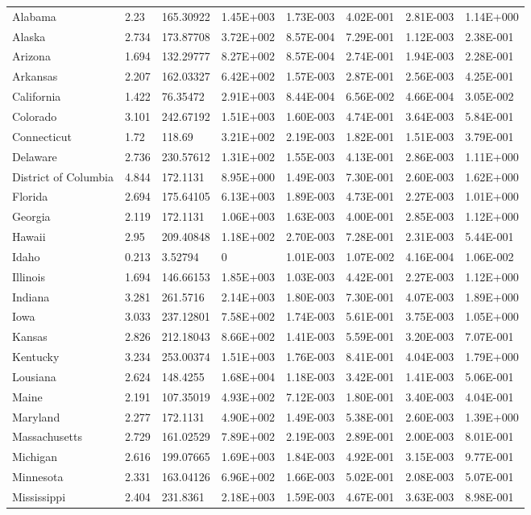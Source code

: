 \begin{longtable}[c]{p{0.75in}p{0.75in}p{0.75in}p{0.75in}p{0.75in}p{0.75in}p{0.75in}p{0.75in}}
Alabama & 2.23 & 165.30922 & 1.45E+003 & 1.73E-003 & 4.02E-001 & 2.81E-003 & 1.14E+000 \tabularnewline
Alaska & 2.734 & 173.87708 & 3.72E+002 & 8.57E-004 & 7.29E-001 & 1.12E-003 & 2.38E-001 \tabularnewline
Arizona & 1.694 & 132.29777 & 8.27E+002 & 8.57E-004 & 2.74E-001 & 1.94E-003 & 2.28E-001 \tabularnewline
Arkansas & 2.207 & 162.03327 & 6.42E+002 & 1.57E-003 & 2.87E-001 & 2.56E-003 & 4.25E-001 \tabularnewline
California & 1.422 & 76.35472 & 2.91E+003 & 8.44E-004 & 6.56E-002 & 4.66E-004 & 3.05E-002 \tabularnewline
Colorado & 3.101 & 242.67192 & 1.51E+003 & 1.60E-003 & 4.74E-001 & 3.64E-003 & 5.84E-001 \tabularnewline
Connecticut & 1.72 & 118.69 & 3.21E+002 & 2.19E-003 & 1.82E-001 & 1.51E-003 & 3.79E-001 \tabularnewline
Delaware & 2.736 & 230.57612 & 1.31E+002 & 1.55E-003 & 4.13E-001 & 2.86E-003 & 1.11E+000 \tabularnewline
District of Columbia & 4.844 & 172.1131 & 8.95E+000 & 1.49E-003 & 7.30E-001 & 2.60E-003 & 1.62E+000 \tabularnewline
Florida & 2.694 & 175.64105 & 6.13E+003 & 1.89E-003 & 4.73E-001 & 2.27E-003 & 1.01E+000 \tabularnewline
Georgia & 2.119 & 172.1131 & 1.06E+003 & 1.63E-003 & 4.00E-001 & 2.85E-003 & 1.12E+000 \tabularnewline
Hawaii & 2.95 & 209.40848 & 1.18E+002 & 2.70E-003 & 7.28E-001 & 2.31E-003 & 5.44E-001 \tabularnewline
Idaho & 0.213 & 3.52794 & 0 & 1.01E-003 & 1.07E-002 & 4.16E-004 & 1.06E-002 \tabularnewline
Illinois & 1.694 & 146.66153 & 1.85E+003 & 1.03E-003 & 4.42E-001 & 2.27E-003 & 1.12E+000 \tabularnewline
Indiana & 3.281 & 261.5716 & 2.14E+003 & 1.80E-003 & 7.30E-001 & 4.07E-003 & 1.89E+000 \tabularnewline
Iowa & 3.033 & 237.12801 & 7.58E+002 & 1.74E-003 & 5.61E-001 & 3.75E-003 & 1.05E+000 \tabularnewline
Kansas & 2.826 & 212.18043 & 8.66E+002 & 1.41E-003 & 5.59E-001 & 3.20E-003 & 7.07E-001 \tabularnewline
Kentucky & 3.234 & 253.00374 & 1.51E+003 & 1.76E-003 & 8.41E-001 & 4.04E-003 & 1.79E+000 \tabularnewline
Lousiana & 2.624 & 148.4255 & 1.68E+004 & 1.18E-003 & 3.42E-001 & 1.41E-003 & 5.06E-001 \tabularnewline
Maine & 2.191 & 107.35019 & 4.93E+002 & 7.12E-003 & 1.80E-001 & 3.40E-003 & 4.04E-001 \tabularnewline
Maryland & 2.277 & 172.1131 & 4.90E+002 & 1.49E-003 & 5.38E-001 & 2.60E-003 & 1.39E+000 \tabularnewline
Massachusetts & 2.729 & 161.02529 & 7.89E+002 & 2.19E-003 & 2.89E-001 & 2.00E-003 & 8.01E-001 \tabularnewline
Michigan & 2.616 & 199.07665 & 1.69E+003 & 1.84E-003 & 4.92E-001 & 3.15E-003 & 9.77E-001 \tabularnewline
Minnesota & 2.331 & 163.04126 & 6.96E+002 & 1.66E-003 & 5.02E-001 & 2.08E-003 & 5.07E-001 \tabularnewline
Mississippi & 2.404 & 231.8361 & 2.18E+003 & 1.59E-003 & 4.67E-001 & 3.63E-003 & 8.98E-001 \tabularnewline

\end{longtable}

